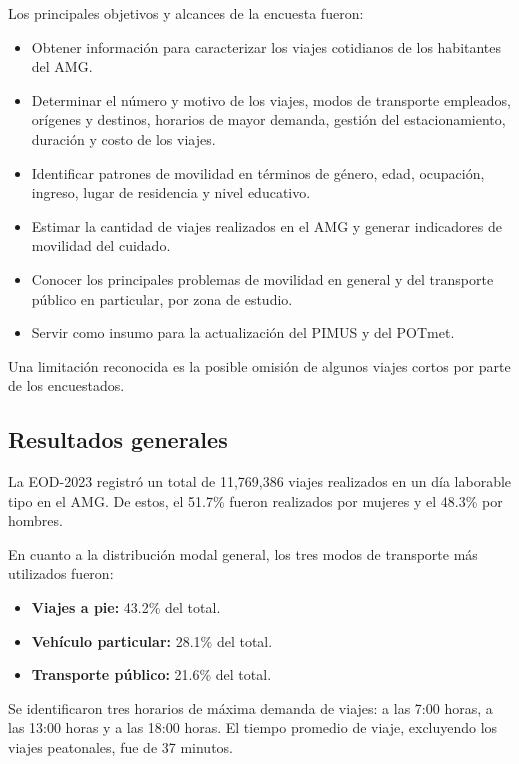 \documentclass[openany]{book}
\begin{document}
            Los principales objetivos y alcances de la encuesta fueron:
            \begin{itemize}
                \item Obtener información para caracterizar los viajes cotidianos de los habitantes del AMG.
                \item Determinar el número y motivo de los viajes, modos de transporte empleados, orígenes y destinos, horarios de mayor demanda, gestión del estacionamiento, duración y costo de los viajes.
                \item Identificar patrones de movilidad en términos de género, edad, ocupación, ingreso, lugar de residencia y nivel educativo.
                \item Estimar la cantidad de viajes realizados en el AMG y generar indicadores de movilidad del cuidado.
                \item Conocer los principales problemas de movilidad en general y del transporte público en particular, por zona de estudio.
                \item Servir como insumo para la actualización del PIMUS y del POTmet.
            \end{itemize}
            Una limitación reconocida es la posible omisión de algunos viajes cortos por parte de los encuestados.

            \subsection{Resultados generales}
            La EOD-2023 registró un total de 11,769,386 viajes realizados en un día laborable tipo en el AMG. De estos, el 51.7\% fueron realizados por mujeres y el 48.3\% por hombres.

            En cuanto a la distribución modal general, los tres modos de transporte más utilizados fueron:
            \begin{itemize}
                \item \textbf{Viajes a pie:} 43.2\% del total.
                \item \textbf{Vehículo particular:} 28.1\% del total.
                \item \textbf{Transporte público:} 21.6\% del total.
            \end{itemize}
            Se identificaron tres horarios de máxima demanda de viajes: a las 7:00 horas, a las 13:00 horas y a las 18:00 horas. El tiempo promedio de viaje, excluyendo los viajes peatonales, fue de 37 minutos.
\end{document}
